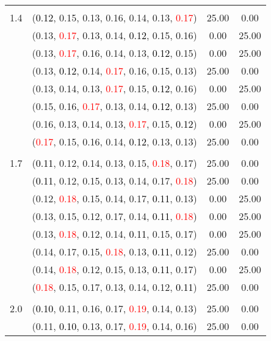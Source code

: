 \documentclass[10pt,a4paper]{report}
\begin{document}
\begin{center}
\begin{longtable}{clcc}
		&&&\\
		1.4			&(\textcolor{black}{0.12}, 0.15, 0.13, 0.16, 0.14, 0.13, \textcolor{red}{0.17})&25.00&0.00\\
			&(0.13, \textcolor{red}{0.17}, 0.13, 0.14, \textcolor{black}{0.12}, 0.15, 0.16)&0.00&25.00\\
			&(0.13, \textcolor{red}{0.17}, 0.16, 0.14, 0.13, \textcolor{black}{0.12}, 0.15)&0.00&25.00\\
			&(0.13, \textcolor{black}{0.12}, 0.14, \textcolor{red}{0.17}, 0.16, 0.15, 0.13)&25.00&0.00\\
			&(0.13, 0.14, 0.13, \textcolor{red}{0.17}, 0.15, \textcolor{black}{0.12}, 0.16)&0.00&25.00\\
			&(0.15, 0.16, \textcolor{red}{0.17}, 0.13, 0.14, \textcolor{black}{0.12}, 0.13)&25.00&0.00\\
			&(0.16, 0.13, 0.14, 0.13, \textcolor{red}{0.17}, 0.15, \textcolor{black}{0.12})&0.00&25.00\\
			&(\textcolor{red}{0.17}, 0.15, 0.16, 0.14, \textcolor{black}{0.12}, 0.13, 0.13)&25.00&0.00\\
		&&&\\
		1.7			&(\textcolor{black}{0.11}, 0.12, 0.14, 0.13, 0.15, \textcolor{red}{0.18}, 0.17)&25.00&0.00\\
			&(\textcolor{black}{0.11}, 0.12, 0.15, 0.13, 0.14, 0.17, \textcolor{red}{0.18})&25.00&0.00\\
			&(0.12, \textcolor{red}{0.18}, 0.15, 0.14, 0.17, \textcolor{black}{0.11}, 0.13)&0.00&25.00\\
			&(0.13, 0.15, 0.12, 0.17, 0.14, \textcolor{black}{0.11}, \textcolor{red}{0.18})&0.00&25.00\\
			&(0.13, \textcolor{red}{0.18}, 0.12, 0.14, \textcolor{black}{0.11}, 0.15, 0.17)&0.00&25.00\\
			&(0.14, 0.17, 0.15, \textcolor{red}{0.18}, 0.13, \textcolor{black}{0.11}, 0.12)&25.00&0.00\\
			&(0.14, \textcolor{red}{0.18}, 0.12, 0.15, 0.13, \textcolor{black}{0.11}, 0.17)&0.00&25.00\\
			&(\textcolor{red}{0.18}, 0.15, 0.17, 0.13, 0.14, 0.12, \textcolor{black}{0.11})&25.00&0.00\\
		&&&\\
		2.0			&(\textcolor{black}{0.10}, 0.11, 0.16, 0.17, \textcolor{red}{0.19}, 0.14, 0.13)&25.00&0.00\\
			&(0.11, \textcolor{black}{0.10}, 0.13, 0.17, \textcolor{red}{0.19}, 0.14, 0.16)&25.00&0.00\\

\end{longtable}
\end{center}
\end{document}
